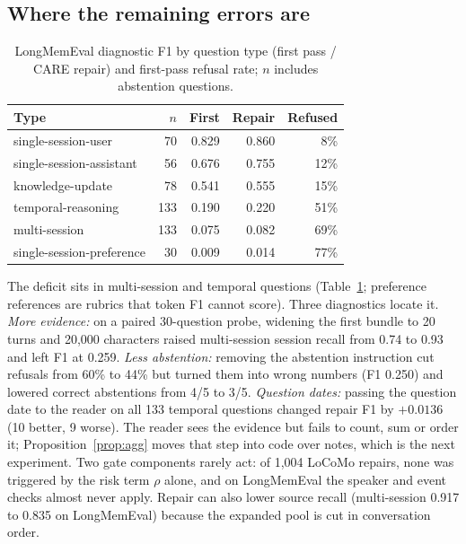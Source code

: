 \documentclass[10pt]{article}
\theoremstyle{plain}
\theoremstyle{definition}
\newcommand{\care}{\textsc{CARE}}
\begin{document}
\subsection{Where the remaining errors are}
\label{sec:errors}

\begin{table}[t]
\centering
\caption{LongMemEval diagnostic F1 by question type (first pass / \care{} repair) and first-pass refusal
rate; $n$ includes abstention questions.}
\label{tab:lme}
\small
\begin{tabular}{lrrrr}
\toprule
Type & $n$ & First & Repair & Refused \\
\midrule
single-session-user & 70 & 0.829 & 0.860 & 8\% \\
single-session-assistant & 56 & 0.676 & 0.755 & 12\% \\
knowledge-update & 78 & 0.541 & 0.555 & 15\% \\
temporal-reasoning & 133 & 0.190 & 0.220 & 51\% \\
multi-session & 133 & 0.075 & 0.082 & 69\% \\
single-session-preference & 30 & 0.009 & 0.014 & 77\% \\
\bottomrule
\end{tabular}
\end{table}

The deficit sits in multi-session and temporal questions (Table~\ref{tab:lme}; preference references
are rubrics that token F1 cannot score). Three diagnostics locate it. \emph{More evidence:} on a paired
30-question probe, widening the first bundle to 20 turns and 20,000 characters raised multi-session
session recall from 0.74 to 0.93 and left F1 at 0.259. \emph{Less abstention:} removing the abstention
instruction cut refusals from 60\% to 44\% but turned them into wrong numbers (F1 0.250) and lowered
correct abstentions from 4/5 to 3/5. \emph{Question dates:} passing the question date to the reader on all
133 temporal questions changed repair F1 by $+0.0136$ (10 better, 9 worse). The reader sees the evidence
but fails to count, sum or order it; Proposition~\ref{prop:agg} moves that step into code over notes, which
is the next experiment. Two gate components rarely act: of 1,004 LoCoMo repairs, none was triggered by the
risk term $\rho$ alone, and on LongMemEval the speaker and event checks almost never apply. Repair can also
lower source recall (multi-session 0.917 to 0.835 on LongMemEval) because the expanded pool is cut in
conversation order.

\end{document}
